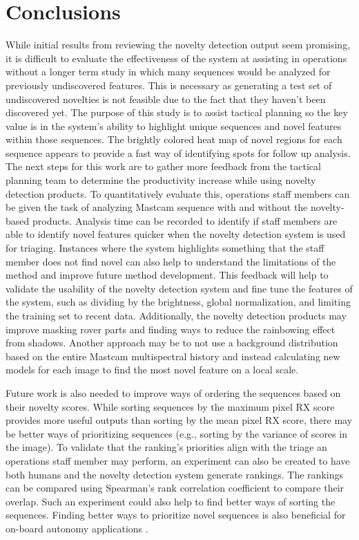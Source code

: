 \section{Conclusions}
While initial results from reviewing the novelty detection output seem promising, it is difficult to evaluate the effectiveness of the system at assisting in operations without a longer term study in which many sequences would be analyzed for previously undiscovered features.
This is necessary as generating a test set of undiscovered novelties is not feasible due to the fact that they haven't been discovered yet.
The purpose of this study is to assist tactical planning so the key value is in the system's ability to highlight unique sequences and novel features within those sequences. 
The brightly colored heat map of novel regions for each sequence appears to provide a fast way of identifying spots for follow up analysis. 
The next steps for this work are to gather more feedback from the tactical planning team to determine the productivity increase while using novelty detection products.
To quantitatively evaluate this, operations staff members can be given the task of analyzing Mastcam sequence with and without the novelty-based products.
Analysis time can be recorded to identify if staff members are able to identify novel features quicker when the novelty detection system is used for triaging.
Instances where the system highlights something that the staff member does not find novel can also help to understand the limitations of the method and improve future method development.
This feedback will help to validate the usability of the novelty detection system and fine tune the features of the system, such as dividing by the brightness, global normalization, and limiting the training set to recent data. 
Additionally, the novelty detection products may improve masking rover parts and finding ways to reduce the rainbowing effect from shadows.
Another approach may be to not use a background distribution based on the entire Mastcam multispectral history and instead calculating new models for each image to find the most novel feature on a local scale.

Future work is also needed to improve ways of ordering the sequences based on their novelty scores.
While sorting sequences by the maximum pixel RX score provides more useful outputs than sorting by the mean pixel RX score, there may be better ways of prioritizing sequences (e.g., sorting by the variance of scores in the image). %
To validate that the ranking's priorities align with the triage an operations staff member may perform, an experiment can also be created to have both humans and the novelty detection system generate rankings.
The rankings can be compared using Spearman's rank correlation coefficient to compare their overlap.
Such an experiment could also help to find better ways of sorting the sequences.
Finding better ways to prioritize novel sequences is also beneficial for on-board autonomy applications \cite{wagstaffnovelty}.

